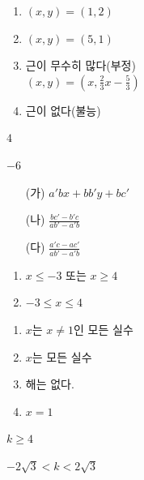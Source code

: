 \documentclass{oblivoir}
\begin{document}
\begin{minipage}[t]{.49\textwidth}
%
\begin{enumerate}
\item
\((x,y)=(1,2)\)
\item
\((x,y)=(5,1)\)
\item
근이 무수히 많다(부정)\\
\((x,y)=\left(x,\frac23x-\frac53\right)\)
\item
근이 없다(불능)
\end{enumerate}

%
\(4\)

%
\(-6\)

%
\begin{enumerate}
\item[(가)]
\(a'bx+bb'y+bc'\)
\item[(나)]
\(\frac{bc'-b'c}{ab'-a'b}\)
\item[(다)]
\(\frac{a'c-ac'}{ab'-a'b}\)
\end{enumerate}
\end{minipage}
\begin{minipage}[t]{0.49\textwidth}
%
\begin{enumerate}
\item
\(x\le-3\) 또는 \(x\ge4\)
\item
\(-3\le x\le 4\)
\end{enumerate}

%
\begin{enumerate}
\item
\(x\)는 \(x\neq1\)인 모든 실수
\item
\(x\)는 모든 실수
\item
해는 없다.
\item
\(x=1\)
\end{enumerate}

%
\(k\ge4\)

%
\(-2\sqrt3<k<2\sqrt3\)
\end{minipage}
\end{document}

